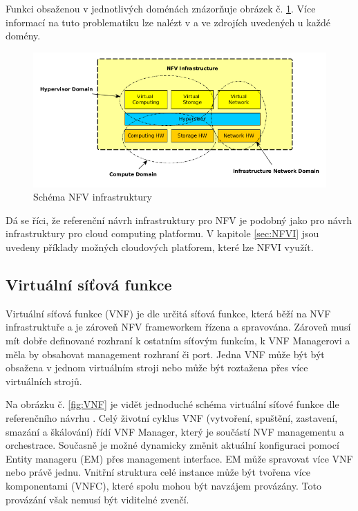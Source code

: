 Funkci obsaženou v jednotlivých doménách znázorňuje obrázek č. \ref{fig:infrastruktura}. Více informací na tuto problematiku lze nalézt v \cite{NFV_infrastructure} a ve zdrojích uvedených u každé domény. 

\begin{figure}[h]
\begin{centering}
\includegraphics[scale=0.65]{images/infrastruktura}
\par\end{centering}
\caption{Schéma NFV infrastruktury\label{fig:infrastruktura}}
\end{figure}

Dá se říci, že referenční návrh infrastruktury pro NFV je podobný jako pro návrh infrastruktury pro cloud computing platformu. V kapitole \ref{sec:NFVI} jsou uvedeny příklady možných cloudových platforem, které lze NFVI využít.

\subsection{Virtuální síťová funkce}

Virtuální síťová funkce (VNF) je dle \cite{NFV_VNF} určitá síťová funkce, která běží na NVF infrastruktuře a je zároveň NFV frameworkem řízena a spravována. Zároveň musí mít dobře definované rozhraní k ostatním síťovým funkcím, k VNF Managerovi a měla by obsahovat management rozhraní či port. Jedna VNF může být být obsažena v jednom virtuálním stroji nebo může být roztažena přes více virtuálních strojů. 

Na obrázku č. \ref{fig:VNF} je vidět jednoduché schéma virtuální síťové funkce dle referenčního návrhu \cite{NFV_VNF}. Celý životní cyklus VNF (vytvoření, spuštění, zastavení, smazání a škálování) řídí VNF Manager, který je součástí NVF managementu a orchestrace. Současně je možné dynamicky změnit aktuální konfiguraci pomocí Entity manageru (EM) přes management interface. EM může spravovat více VNF nebo právě jednu. Vnitřní struktura celé instance může být tvořena více komponentami (VNFC), které spolu mohou být navzájem provázány. Toto provázání však nemusí být viditelné zvenčí.

